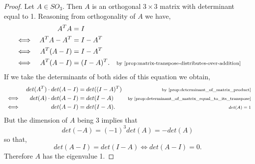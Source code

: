 \documentclass[MathsNotesBase.tex]{subfiles}
\begin{document}
{	\bigskip
	\begin{proof}
		Let ${ A \in SO_3 }$. Then $A$ is an orthogonal ${ 3 \times 3 }$ matrix with determinant equal to 1. Reasoning from orthogonality of $A$ we have,
		\begin{align*}
		&& A^TA &= I \\
		&\iff & A^TA - A^T &= I - A^T &\sidecomment{} \\
		&\iff & A^T(A - I) &= I - A^T &\sidecomment{} \\
		&\iff & A^T(A - I) &= (I - A)^T. &\sidecomment{by \autoref{prop:matrix-transpose-distributes-over-addition}}
		\end{align*}
		If we take the determinants of both sides of this equation we obtain,
		\begin{align*}
		&& det(A^T)\cdot det(A - I) &= det((I-A)^T) &\sidecomment{by \autoref{prop:determinant_of_matrix_product}} \\
		&\iff & det(A)\cdot det(A - I) &= det(I - A) &\sidecomment{by \autoref{prop:determinant_of_matrix_equal_to_its_transpose}} \\
		&\iff & det(A - I) &= det(I - A). &\sidecomment{${ det(A) = 1 }$}
		\end{align*}
		But the dimension of $A$ being 3 implies that
		\[ det(-A) = (-1)^3 det(A) = -det(A) \]
		so that,
		\[ det(A - I) = det(I - A) \iff det(A - I) = 0. \]
		Therefore $A$ has the eigenvalue 1.
	\end{proof}

}
\end{document}

